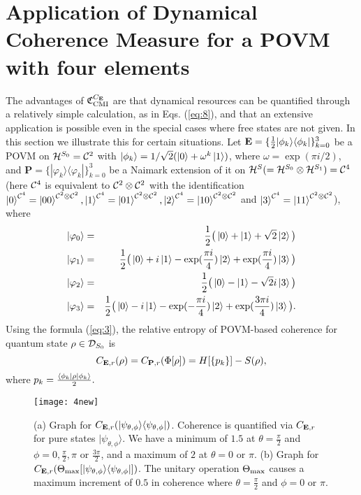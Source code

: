 \documentclass[american,aps,pra,reprint, superscriptaddress]{revtex4-1}
\def\be{\begin{equation}}
\def\ee{\end{equation}}
\def\bea{\begin{eqnarray*}}
\def\eea{\end{eqnarray*}}
\def\ot{\otimes}
\theoremstyle{plain}
\newcommand{\out}[2]{| #1\rangle\langle #2 |}
\def\bP{\mathbf{P}}\def\bQ{\mathbf{Q}}\def\bR{\mathbf{R}}\def\bS{\mathbf{S}}\def\bT{\mathbf{T}}
\def\mCMI{\textmd{CMI}} \def\mI{\textmd{I}} \def\mPI{\textmd{PI}}
\def\fC{\mathfrak{C}}\def\fD{\mathfrak{D}}\def\fF{\mathfrak{F}}\def\fP{\mathfrak{P}}
\theoremstyle{definition}
\theoremstyle{remark}
\begin{document}
\section{Application of Dynamical Coherence Measure for a POVM with four elements}

The advantages of $\fC_{\mCMI}^{C_\bE}$ are that dynamical resources can be quantified through a relatively simple calculation, as in Eqs. (\ref{eq:8}), and that an extensive application is possible even in the special cases where free states are not given. In this section we illustrate this for certain situations.
%
Let $\bE = \{\frac{1}{2}\out{\phi_k}{\phi_k}\}_{k=0}^3$ be a POVM on $\mathcal{H}^{S_0} = \mathcal{C}^2$ with $\ket{\phi_k} = 1/\sqrt{2}(\ket{0}+\omega^{k}\ket{1})$, where $\omega = \exp(\pi i/2)$, and $\bP = \{\out{\varphi_k}{\varphi_k}\}_{k=0}^3$ be a Naimark extension of it on $\cH^{S}(=\cH^{S_0}\ot\cH^{S_1})=\cC^4$ (here $\mathcal{C}^4$ is equivalent to $\cC^2\ot\cC^2$ with the identification $\ket{0}^{\cC^4} = \ket{00}^{\cC^2\ot\cC^2}, \ket{1}^{\cC^4} = \ket{01}^{\cC^2\ot\cC^2}, \ket{2}^{\cC^4} = \ket{10}^{\cC^2\ot\cC^2}$ and $\ket{3}^{\cC^4} = \ket{11}^{\cC^2\ot\cC^2}$), where
\bea
\ket{\varphi_0}&=&\frac{1}{2}\big(\ket{0}+\ket{1}+\sqrt{2}\ket{2}\big)\\
\ket{\varphi_1}&=&\frac{1}{2}\big(\ket{0}+i\ket{1}-\exp(\frac{\pi i}{4})\ket{2}+\exp(\frac{\pi i}{4})\ket{3}\big)\\
\ket{\varphi_2}&=&\frac{1}{2}\big(\ket{0}-\ket{1}-\sqrt{2}i\ket{3}\big)\\
\ket{\varphi_3}&=&\frac{1}{2}\big(\ket{0}-i\ket{1}-\exp(-\frac{\pi i}{4})\ket{2}+\exp(\frac{3\pi i}{4})\ket{3}\big).
\eea
Using the formula (\ref{eq:3}), the relative entropy of POVM-based coherence for quantum state $\rho\in \mathcal{D}_{S_0}$ is
\be
C_{\bE,r}(\rho) = C_{\bP,r}(\Phi[\rho]) = H[\{p_k\}] - S(\rho),
\ee
where $p_k = \frac{\bra{\phi_k}\rho\ket{\phi_k}}{2}.$

\begin{figure}[t]
\centering
\texttt{[image: 4new]}
\caption{\label{fig:1} (a) Graph for $C_{\bE,r}(\out{\psi_{\theta,\phi}}{\psi_{\theta,\phi}})$. Coherence is quantified via $C_{\mathbf{E},r}$ for pure states $|\psi_{\theta,\phi}\rangle$. We have a minimum of $1.5$ at $\theta=\frac{\pi}{2}$ and $\phi=0, \frac{\pi}{2}, \pi$ or $\frac{3\pi}{2}$, and a maximum of $2$ at $\theta=0$ or $\pi$.  (b) Graph for $C_{\bE,r}(\Theta_{\textmd{max}}[\out{\psi_{\theta,\phi}}{\psi_{\theta,\phi}}])$. The unitary operation $\Theta_{\textmd{max}}$ causes a maximum increment of $0.5$ in coherence where $\theta=\frac{\pi}{2}$ and $\phi=0$ or $\pi$.}
\end{figure}
\end{document}
